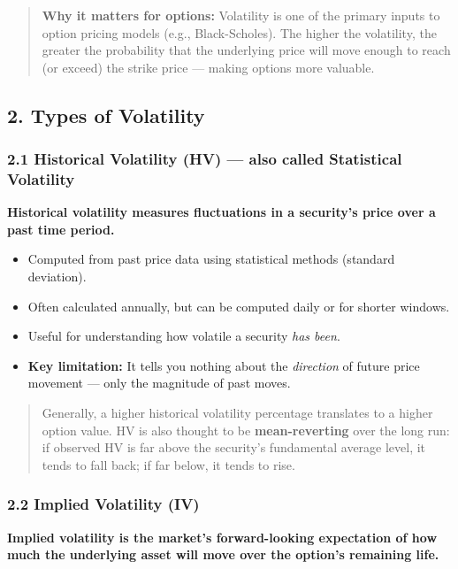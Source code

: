\documentclass[12pt,openany]{book}
\begin{document}
\begin{quote}
\textbf{Why it matters for options:} Volatility is one of the primary inputs to option pricing models (e.g., Black-Scholes). The higher the volatility, the greater the probability that the underlying price will move enough to reach (or exceed) the strike price — making options more valuable.
\end{quote}

\subsection{2. Types of Volatility}

\subsubsection{2.1 Historical Volatility (HV) — also called Statistical Volatility}

\textbf{Historical volatility measures fluctuations in a security's price over a past time period.}

\begin{itemize}[leftmargin=*]
    \item Computed from past price data using statistical methods (standard deviation).
    \item Often calculated annually, but can be computed daily or for shorter windows.
    \item Useful for understanding how volatile a security \emph{has been}.
    \item \textbf{Key limitation:} It tells you nothing about the \emph{direction} of future price movement — only the magnitude of past moves.
\end{itemize}

\begin{quote}
Generally, a higher historical volatility percentage translates to a higher option value.
HV is also thought to be \textbf{mean-reverting} over the long run: if observed HV is far above the security's fundamental average level, it tends to fall back; if far below, it tends to rise.
\end{quote}

\subsubsection{2.2 Implied Volatility (IV)}

\textbf{Implied volatility is the market's forward-looking expectation of how much the underlying asset will move over the option's remaining life.}
\end{document}
